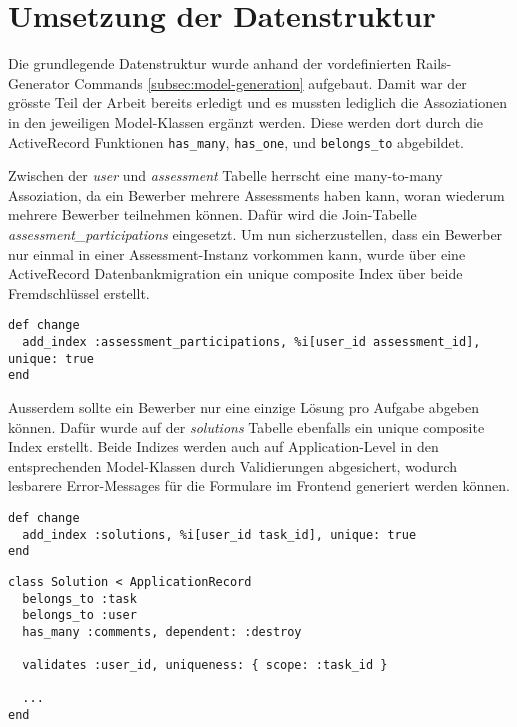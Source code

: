 \section{Umsetzung der Datenstruktur}

Die grundlegende Datenstruktur wurde anhand der vordefinierten Rails-Generator Commands \ref{subsec:model-generation} aufgebaut.
Damit war der grösste Teil der Arbeit bereits erledigt und es mussten lediglich die Assoziationen in den jeweiligen Model-Klassen ergänzt werden.
Diese werden dort durch die ActiveRecord Funktionen \texttt{has_many}, \texttt{has_one}, und \texttt{belongs_to} abgebildet.

Zwischen der \emph{user} und \emph{assessment} Tabelle herrscht eine many-to-many Assoziation, da ein Bewerber mehrere Assessments haben kann, 
woran wiederum mehrere Bewerber teilnehmen können. Dafür wird die Join-Tabelle \emph{assessment\_participations} eingesetzt. 
Um nun sicherzustellen, dass ein Bewerber nur einmal in einer Assessment-Instanz vorkommen kann, wurde über eine ActiveRecord Datenbankmigration ein 
unique composite Index über beide Fremdschlüssel erstellt.

\begin{codebox}
\begin{verbatim}
def change
  add_index :assessment_participations, %i[user_id assessment_id], unique: true
end

\end{verbatim}
\end{codebox}

Ausserdem sollte ein Bewerber nur eine einzige Lösung pro Aufgabe abgeben können. Dafür wurde auf der \emph{solutions}
Tabelle ebenfalls ein unique composite Index erstellt. Beide Indizes werden auch auf Application-Level in den entsprechenden Model-Klassen
durch Validierungen abgesichert, wodurch lesbarere Error-Messages für die Formulare im Frontend generiert werden können.

\begin{codebox}
\begin{verbatim}
def change
  add_index :solutions, %i[user_id task_id], unique: true
end
\end{verbatim}
\end{codebox}

\begin{codebox}
\begin{verbatim}
class Solution < ApplicationRecord
  belongs_to :task
  belongs_to :user
  has_many :comments, dependent: :destroy

  validates :user_id, uniqueness: { scope: :task_id }

  ...
end
\end{verbatim}
\end{codebox}

